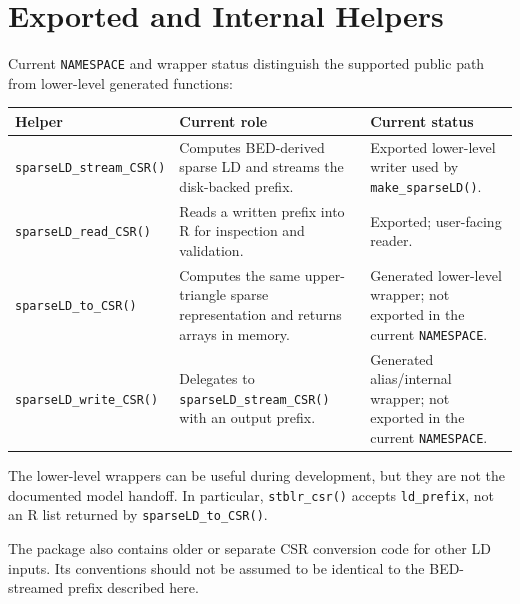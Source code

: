 \documentclass[
  11pt,
  letterpaper,
  DIV=11,
  numbers=noendperiod]{scrartcl}
\begin{document}
\section{Exported and Internal
Helpers}\label{exported-and-internal-helpers}

Current \texttt{NAMESPACE} and wrapper status distinguish the supported
public path from lower-level generated functions:

\begin{longtable}[]{@{}
  >{\raggedright\arraybackslash}p{}
  >{\raggedright\arraybackslash}p{}
  >{\raggedright\arraybackslash}p{}@{}}
\toprule\noalign{}
\begin{minipage}[b]{\linewidth}\raggedright
Helper
\end{minipage} & \begin{minipage}[b]{\linewidth}\raggedright
Current role
\end{minipage} & \begin{minipage}[b]{\linewidth}\raggedright
Current status
\end{minipage} \\
\midrule\noalign{}
\endhead
\bottomrule\noalign{}
\endlastfoot
\texttt{sparseLD\_stream\_CSR()} & Computes BED-derived sparse LD and
streams the disk-backed prefix. & Exported lower-level writer used by
\texttt{make\_sparseLD()}. \\
\texttt{sparseLD\_read\_CSR()} & Reads a written prefix into R for
inspection and validation. & Exported; user-facing reader. \\
\texttt{sparseLD\_to\_CSR()} & Computes the same upper-triangle sparse
representation and returns arrays in memory. & Generated lower-level
wrapper; not exported in the current \texttt{NAMESPACE}. \\
\texttt{sparseLD\_write\_CSR()} & Delegates to
\texttt{sparseLD\_stream\_CSR()} with an output prefix. & Generated
alias/internal wrapper; not exported in the current
\texttt{NAMESPACE}. \\
\end{longtable}

The lower-level wrappers can be useful during development, but they are
not the documented model handoff. In particular, \texttt{stblr\_csr()}
accepts \texttt{ld\_prefix}, not an R list returned by
\texttt{sparseLD\_to\_CSR()}.

The package also contains older or separate CSR conversion code for
other LD inputs. Its conventions should not be assumed to be identical
to the BED-streamed prefix described here.
\end{document}

